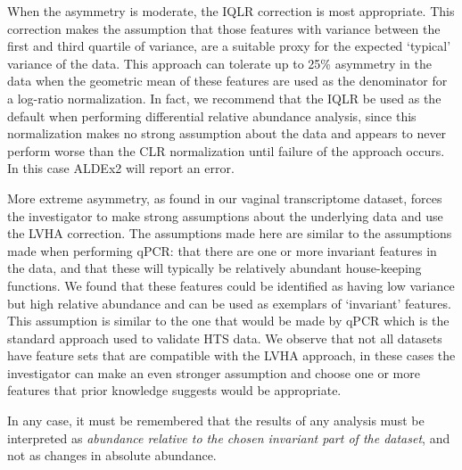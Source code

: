 \documentclass{bmcart}
\begin{document}
When the asymmetry is moderate, the IQLR correction is most appropriate. This correction makes the assumption that those features with variance between the first and third quartile of variance, are a suitable proxy for the expected `typical' variance of the data. This approach can tolerate up to 25\% asymmetry in the data when the geometric mean of these features are used as the denominator for a log-ratio normalization. In fact, we recommend that the IQLR be used as the default when performing differential relative abundance analysis, since this normalization makes no strong assumption about the data and appears to never perform worse than the CLR normalization until failure of the approach occurs. In this case ALDEx2 will report an error.

More extreme asymmetry, as found in our vaginal transcriptome dataset, forces the investigator to make strong assumptions about the underlying data and use the LVHA correction. The assumptions made here are similar to the assumptions made when performing qPCR: that there are one or more invariant features in the data, and that these will typically be relatively abundant house-keeping functions. We found that these features could be identified as having low variance but high relative abundance and can be used as exemplars of `invariant' features. This assumption is similar to the one that would be made by qPCR which is the standard approach used to validate HTS data. We observe that not all datasets have feature sets that are compatible with the LVHA approach, in these cases the investigator can make an even stronger assumption and choose one or more features that prior knowledge suggests would be appropriate. 

In any case, it must be remembered that the results of any analysis must be interpreted as \emph{abundance relative to the chosen invariant part of the dataset}, and not as changes in absolute abundance.


\end{document}
